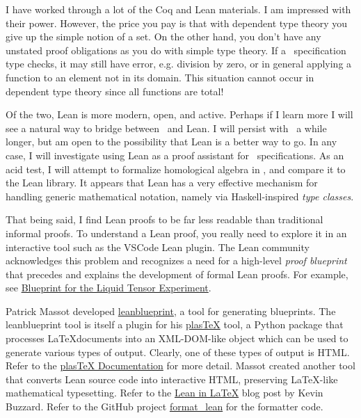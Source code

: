 \documentclass{amsart}
\begin{document}
I have worked through a lot of the Coq and Lean materials.
I am impressed with their power.
However, the price you pay is that with dependent type theory you give up the simple notion of a set.
On the other hand, you don't have any unstated proof obligations as you do with simple type theory.
If a \ZN\ specification type checks, it may still have error, e.g. division by zero, or in general applying a function
to an element not in its domain.
This situation cannot occur in dependent type theory since all functions are total!

Of the two, Lean is more modern, open, and active.
Perhaps if I learn more I will see a natural way to bridge between \ZN\ and Lean.
I will persist with \ZN\ a while longer, but am open to the possibility that Lean is a better way to go.
In any case, I will investigate using Lean as a proof assistant for \ZN\ specifications.
As an acid test, I will attempt to formalize homological algebra in \ZN, and compare it to the Lean library.
It appears that Lean has a very effective mechanism for handling generic mathematical notation,
namely via Haskell-inspired \textit{type classes}.

That being said, I find Lean proofs to be far less readable than traditional informal proofs.
To understand a Lean proof, you really need to explore it in an interactive tool such as the VSCode Lean plugin.
The Lean community acknowledges this problem and recognizes a need for a high-level \textit{proof blueprint}
that precedes and explains the development of formal Lean proofs.
For example, see \href{https://leanprover-community.github.io/liquid/index.html}{Blueprint for the Liquid Tensor Experiment}.

Patrick Massot developed \href{https://github.com/PatrickMassot/leanblueprint}{leanblueprint}, a tool for generating blueprints.
The leanblueprint tool is itself a plugin for his \href{https://github.com/plastex/plastex/}{plasTeX} tool,
a Python package that processes \LaTeX documents into an XML-DOM-like object which can be used to generate various types of output.
Clearly, one of these types of output is HTML.
Refer to the \href{http://plastex.github.io/plastex/}{plasTeX Documentation} for more detail.
Massot created another tool that converts Lean source code into interactive HTML, preserving \LaTeX-like mathematical typesetting.
Refer to the \href{https://xenaproject.wordpress.com/2019/02/11/lean-in-latex/}{Lean in LaTeX} blog post by Kevin Buzzard.
Refer to the GitHub project \href{https://github.com/leanprover-community/format_lean}{format\_lean} for the formatter code.
\end{document}
